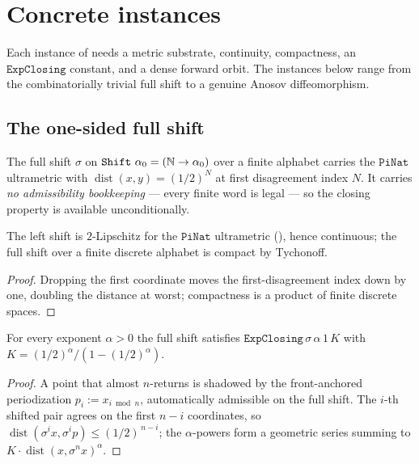 \section{Concrete instances}

Each instance of  needs a metric substrate, continuity, compactness, an
\(\texttt{ExpClosing}\) constant, and a dense forward orbit. The instances below range from the
combinatorially trivial full shift to a genuine Anosov diffeomorphism.

\subsection{The one-sided full shift}

The full shift \(\sigma\) on \(\texttt{Shift}\ \alpha_0 = (\mathbb{N}\to\alpha_0)\) over a finite alphabet
carries the \(\texttt{PiNat}\) ultrametric with \(\operatorname{dist}(x,y) = (1/2)^{N}\) at first disagreement
index \(N\). It carries \emph{no admissibility bookkeeping} --- every finite word is legal --- so
the closing property is available unconditionally.

\begin{lemma}\label{lem:livsic-shiftmetric}
  \leanok
  The left shift is \(2\)-Lipschitz for the \(\texttt{PiNat}\) ultrametric
  (), hence continuous; the full shift over a
  finite discrete alphabet is compact by Tychonoff.
\end{lemma}
\begin{proof}\leanok
  Dropping the first coordinate moves the first-disagreement index down by one, doubling the
  distance at worst; compactness is a product of finite discrete spaces.
\end{proof}

\begin{theorem}\label{thm:livsic-shift-closing}
  \leanok
  For every exponent \(\alpha > 0\) the full shift satisfies \(\texttt{ExpClosing}\,\sigma\,\alpha\,1\,K\)
  with \(K = (1/2)^{\alpha}/(1 - (1/2)^{\alpha})\).
\end{theorem}
\begin{proof}\leanok
  A point that almost \(n\)-returns is shadowed by the front-anchored periodization
  \(p_i := x_{i\bmod n}\), automatically admissible on the full shift. The \(i\)-th shifted pair
  agrees on the first \(n-i\) coordinates, so \(\operatorname{dist}(\sigma^i x,\sigma^i p)\le(1/2)^{\,n-i}\); the
  \(\alpha\)-powers form a geometric series summing to \(K\cdot\operatorname{dist}(x,\sigma^n x)^{\alpha}\).
\end{proof}

